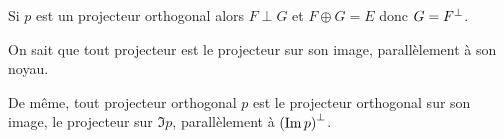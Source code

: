 \begin{dem}[1]
Si \(p\) est un projecteur orthogonal alors \(F\perp G\) et \(F\oplus G=E\) donc \(G=F^{\perp}\).
\end{dem}

\begin{rem}
On sait que tout projecteur est le projecteur sur son image, parallèlement à son noyau.

De même, tout projecteur orthogonal \(p\) est le projecteur orthogonal sur son image, \cad le projecteur sur \(\Im p\), parallèlement à \(\left(\operatorname{Im} p\right)^{\perp}\).
\end{rem}

